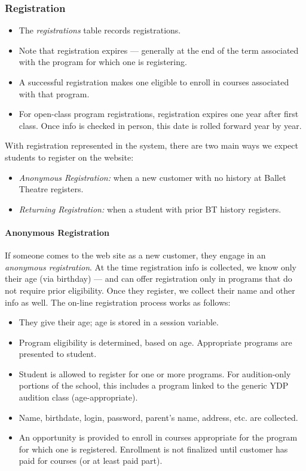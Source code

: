 \documentclass[11pt]{article}
\begin{document}
\subsubsection{Registration}

 \begin{itemize}
 \item The \emph{registrations} table records registrations.
 \item Note that registration expires --- generally at the end of the term associated with the program for which one is registering.
 \item A successful registration makes one eligible to enroll in courses associated with that program.
 \item For open-class program registrations, registration expires one year after first class.  Once info is checked in person, this date is rolled forward year by year.
 \end{itemize}

With registration represented in the system, there are two main ways we expect students to register on the website:
 \begin{itemize}
	\item \emph{Anonymous Registration:} when a new customer with no history at Ballet Theatre registers.
	\item \emph{Returning Registration:} when a student with prior BT history registers.
 \end{itemize}


\paragraph{Anonymous Registration}

If someone comes to the web site as a new customer, they engage in an \emph{anonymous registration}.  At the time registration info is collected, we know only their age (via birthday) --- and can offer registration only in programs that do not require prior eligibility.  Once they register, we collect their name and other info as well.  The on-line registration process works as follows:

 \begin{itemize}
 \item They give their age; age is stored in a session variable.
 \item Program eligibility is determined, based on age.  Appropriate programs are presented to student.
 \item Student is allowed to register for one or more programs.  For audition-only portions of the school, this includes a program linked to the generic YDP audition class (age-appropriate).
 \item Name, birthdate, login, password, parent's name, address, etc. are collected.
 \item An opportunity is provided to enroll in courses appropriate for the program for which one is registered.  Enrollment is not finalized until customer has paid for courses (or at least paid part).
 \end{itemize}
\end{document}
